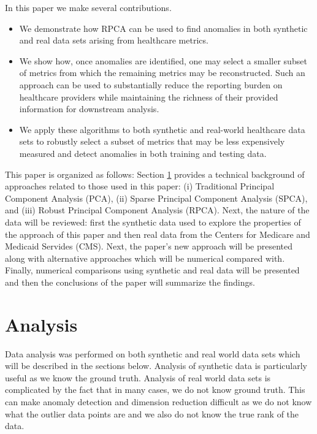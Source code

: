 \documentclass[conference]{IEEEtran}
\begin{document}
In this paper we make several contributions.

\begin{itemize}
    \item We demonstrate how RPCA can be used to find anomalies in both synthetic and real data sets arising from healthcare metrics.   
    \item We show how, once anomalies are identified, one may select a smaller subset of metrics from which the remaining metrics may be reconstructed.   Such an approach can be used to substantially reduce the reporting burden on healthcare providers while maintaining the richness of their provided information for downstream analysis.
    \item We apply these algorithms to both synthetic and real-world healthcare data sets to robustly select a subset of metrics that may be less expensively measured and detect anomalies in both training and testing data.
\end{itemize}
\bigskip
This paper is organized as follows:  Section \ref{anal} provides a technical background of approaches related to those used in this paper: (i) Traditional Principal Component Analysis (PCA), (ii) Sparse Principal Component Analysis (SPCA), and (iii) Robust Principal Component Analysis (RPCA). Next, the nature of the data will be reviewed: first the synthetic data used to explore the properties of the approach of this paper and then real data from the Centers for Medicare and Medicaid Servides (CMS). Next, the paper's new approach will be presented along with alternative approaches which will be numerical compared with. Finally, numerical comparisons using synthetic and real data will be presented and then the conclusions of the paper will summarize the findings.

\section{Analysis} \label{anal}
Data analysis was performed on both synthetic and real world data sets which will be described in the sections below. Analysis of synthetic data is particularly useful as we know the ground truth. Analysis of real world data sets is complicated by the fact that in many cases, we do not know ground truth.  This can make anomaly detection and dimension reduction difficult as we do not know what the outlier data points are and we also do not know the true rank of the data.
\end{document}
